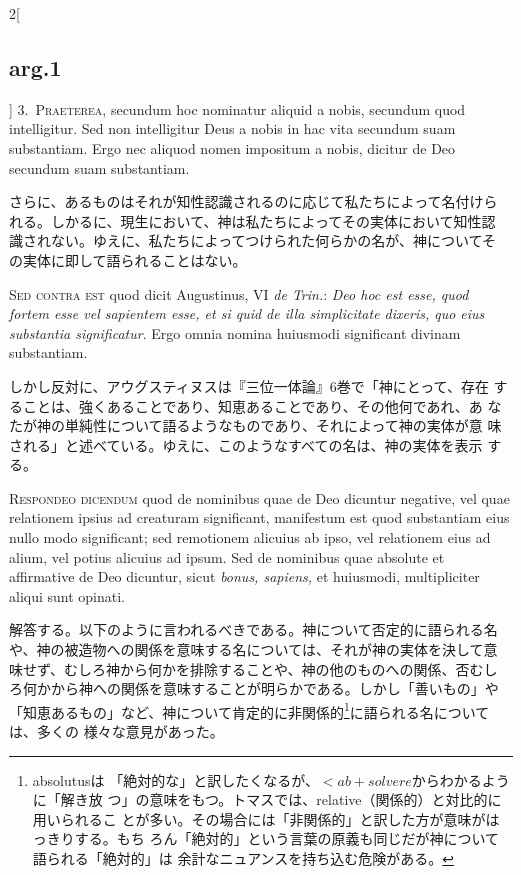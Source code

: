 \documentclass[paper=a4paper,fontsize=10pt,jafontsize=9pt,titlepage]{jlreq}
\begin{document}
\begin{paracol}{2}[\subsection{arg.1}]
3.~{\scshape Praeterea}, secundum hoc nominatur aliquid a nobis, secundum
quod intelligitur. Sed non intelligitur Deus a nobis in hac vita
secundum suam substantiam. Ergo nec aliquod nomen impositum a nobis,
dicitur de Deo secundum suam substantiam.

\switchcolumn

さらに、あるものはそれが知性認識されるのに応じて私たちによって名付けら
れる。しかるに、現生において、神は私たちによってその実体において知性認
識されない。ゆえに、私たちによってつけられた何らかの名が、神についてそ
の実体に即して語られることはない。

\switchcolumn*[\subsection{s.c.}]

{\scshape Sed contra est} quod dicit Augustinus, VI {\itshape de Trin.}: {\itshape
Deo hoc est esse, quod fortem esse vel sapientem esse, et si quid de
illa simplicitate dixeris, quo eius substantia significatur}. Ergo
omnia nomina huiusmodi significant divinam substantiam.

\switchcolumn

しかし反対に、アウグスティヌスは『三位一体論』6巻で「神にとって、存在
することは、強くあることであり、知恵あることであり、その他何であれ、あ
なたが神の単純性について語るようなものであり、それによって神の実体が意
味される」と述べている。ゆえに、このようなすべての名は、神の実体を表示
する。


{\scshape Respondeo dicendum} quod de nominibus quae de Deo dicuntur
negative, vel quae relationem ipsius ad creaturam significant,
manifestum est quod substantiam eius nullo modo significant; sed
remotionem alicuius ab ipso, vel relationem eius ad alium, vel potius
alicuius ad ipsum. Sed de nominibus quae absolute et affirmative de
Deo dicuntur, sicut {\itshape bonus, sapiens,} et huiusmodi, multipliciter
aliqui sunt opinati.

\switchcolumn

解答する。以下のように言われるべきである。神について否定的に語られる名
や、神の被造物への関係を意味する名については、それが神の実体を決して意
味せず、むしろ神から何かを排除することや、神の他のものへの関係、否むし
ろ何かから神への関係を意味することが明らかである。しかし「善いもの」や
「知恵あるもの」など、神について肯定的に非関係的\footnote{absolutusは
「絶対的な」と訳したくなるが、$< ab + solvere$からわかるように「解き放
つ」の意味をもつ。トマスでは、relative（関係的）と対比的に用いられるこ
とが多い。その場合には「非関係的」と訳した方が意味がはっきりする。もち
ろん「絶対的」という言葉の原義も同じだが神について語られる「絶対的」は
余計なニュアンスを持ち込む危険がある。}に語られる名については、多くの
様々な意見があった。


\end{paracol}
\end{document}
